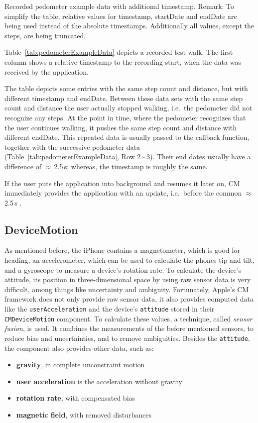 \begin{table}
	
	\caption{Recorded pedometer example data with additional timestamp. Remark: To simplify the table, relative values for timestamp, startDate and endDate are being used instead of the absolute timestamps. Additionally all values, except the steps, are being truncated.}
	\label{tab:pedometerExampleData}
\end{table}


\noindent Table~\ref{tab:pedometerExampleData} depicts a recorded test walk. The first column shows a relative timestamp to the recording start, when the data was received by the application.

The table depicts some entries with the same step count and distance, but with different timestamp and endDate. Between these data sets with the same step count and distance the user actually stopped walking, i.e.\ the pedometer did not recognize any steps. At the point in time, where the pedometer recognizes that the user continues walking, it pushes the same step count and distance with different endDate. This repeated data is usually passed to the callback function, together with the successive pedometer data (Table~\ref{tab:pedometerExampleData}, Row 2\,--\,3). Their end dates usually have a difference of $\approx$\,2.5\,s; whereas, the timestamp is roughly the same.

If the user puts the application into background and resumes it later on, \ac{CM} immediately provides the application with an update, i.e.\ before the common $\approx$\,2.5\,s \citep{apple:wwdc_2014_pham}.


\subsection{DeviceMotion}
As mentioned before, the iPhone contains a magnetometer, which is good for heading, an accelerometer, which can be used to calculate the phones tip and tilt, and a gyroscope to measure a device's rotation rate. To calculate the device's attitude, its position in three-dimensional space by using raw sensor data is very difficult, among things like uncertainty and ambiguity. Fortunately, Apple's \ac{CM} framework does not only provide raw sensor data, it also provides computed data like the \texttt{userAcceleration} and the device's \texttt{attitude} stored in their \texttt{CMDeviceMotion} component. To calculate these values, a technique, called \emph{sensor fusion}, is used. It combines the measurements of the before mentioned sensors, to reduce bias and uncertainties, and to remove ambiguities. Besides the \texttt{attitude}, the component also provides other data, such as:
\begin{itemize}
  \item \textbf{gravity}, in complete unconstraint motion
  \item \textbf{user acceleration} is the acceleration without gravity
  \item \textbf{rotation rate}, with compensated bias
  \item \textbf{magnetic field}, with removed disturbances
\end{itemize}

